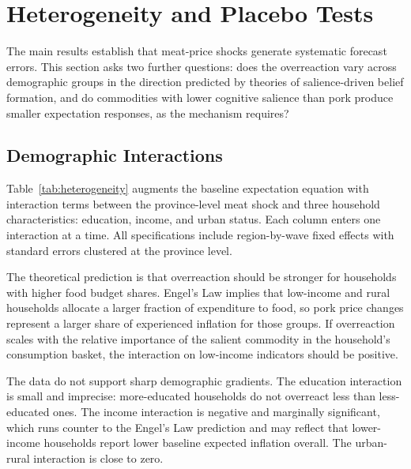 
\section{Heterogeneity and Placebo Tests}\label{sec:heterogeneity}

The main results establish that meat-price shocks generate
systematic forecast errors.
This section asks two further questions:
does the overreaction vary across demographic groups in
the direction predicted by theories of salience-driven belief
formation, and do commodities with lower cognitive salience than
pork produce smaller expectation responses, as the mechanism
requires?

\subsection{Demographic Interactions}\label{sec:demo_het}



Table~\ref{tab:heterogeneity} augments the baseline
expectation equation with interaction terms between
the province-level meat shock and three household
characteristics: education, income, and urban status.
Each column enters one interaction at a time.
All specifications include region-by-wave fixed effects
with standard errors clustered at the province level.

The theoretical prediction is that overreaction should be
stronger for households with higher food budget shares.
Engel's Law implies that low-income and rural households
allocate a larger fraction of expenditure to food, so pork
price changes represent a larger share of experienced
inflation for those groups.
If overreaction scales with the relative importance of the
salient commodity in the household's consumption basket,
the interaction on low-income indicators should be positive.

The data do not support sharp demographic gradients.
The education interaction is small and imprecise: more-educated
households do not overreact less than less-educated ones.
The income interaction is negative and marginally significant,
which runs counter to the Engel's Law prediction and may reflect
that lower-income households report lower baseline expected
inflation overall.
The urban-rural interaction is close to zero.

